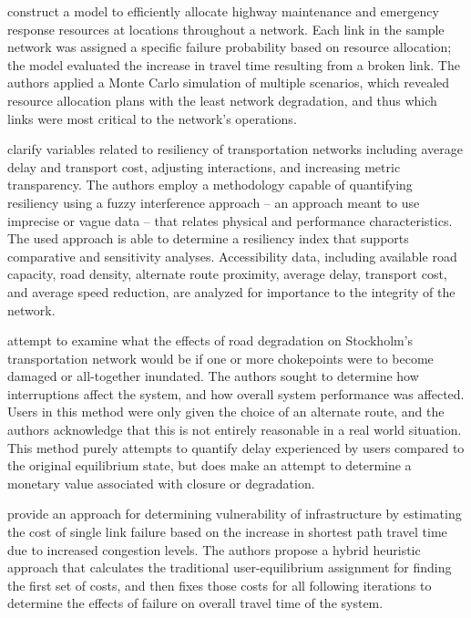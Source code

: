 \citet{peeta2010} construct a model to efficiently allocate
highway maintenance and emergency response resources at locations throughout a
network. Each link in the sample network was
assigned a specific failure probability based on resource allocation;
the model evaluated the increase in travel time resulting from a broken
link. The authors applied a Monte Carlo simulation  of multiple scenarios,
which revealed resource allocation plans with the least network degradation,
and thus which links were most critical to the network's operations.

\citet{serulle2011} clarify variables related to resiliency
of transportation networks including average delay and transport cost,
adjusting interactions,
and increasing metric transparency. The authors employ a methodology
capable of quantifying
resiliency using a fuzzy interference approach – an approach meant to use
imprecise or vague data
– that relates physical and performance characteristics. The used approach
is able to determine a
resiliency index that supports comparative and sensitivity analyses.
Accessibility data, including
available road capacity, road density, alternate route proximity, average
delay, transport cost,
and average speed reduction, are analyzed for importance to the integrity
of the network.

\citet{Berdica2007} attempt to examine what the effects of road
degradation on Stockholm's transportation network would be if one or more
chokepoints were to become damaged or all-together inundated. The authors
sought to determine how interruptions affect the system, and how overall
system performance was affected. Users in this method were only given the
choice of an alternate route, and the authors acknowledge that this is not
entirely reasonable in a real world situation. This method purely attempts
to quantify delay experienced by users compared to the original
equilibrium state, but does make an attempt to determine a monetary value
associated with closure or degradation.

\citet{ibrahim2011} provide an approach for determining
vulnerability of infrastructure by estimating the cost of single link
failure based on the increase in shortest path travel time due to
increased congestion
levels. The authors propose a hybrid heuristic approach that calculates the
traditional user-equilibrium assignment for finding the first set of
costs, and
then fixes those costs for all following iterations to determine the
effects of
failure on overall travel time of the system.

